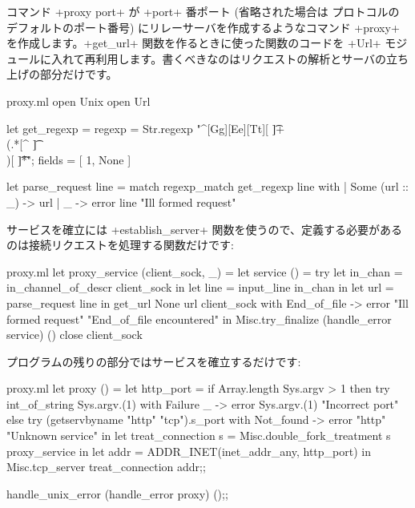 コマンド \ml+proxy port+ が \ml+port+ 番ポート (省略された場合は \http プロトコルのデフォルトのポート番号) にリレーサーバを作成するようなコマンド \ml+proxy+ を作成します。\ml+get_url+ 関数を作るときに使った関数のコードを \ml+Url+ モジュールに入れて再利用します。書くべきなのはリクエストの解析とサーバの立ち上げの部分だけです。
%
\begin{listingcodefile}{proxy.ml}
open Unix
open Url

let get_regexp =
  { regexp = Str.regexp "^[Gg][Ee][Tt][ \t]+\\(.*[^ \t]\\)[ \t]*\r";
    fields = [ 1, None ] }

let parse_request line = match regexp_match get_regexp line with
  | Some (url :: _) -> url
  | _ -> error line "Ill formed request"
\end{listingcodefile}
%
サービスを確立には \ml+establish_server+ 関数を使うので、定義する必要があるのは接続リクエストを処理する関数だけです:
%
\begin{listingcodefile}{proxy.ml}
let proxy_service (client_sock, _) =
  let service () =
    try
      let in_chan = in_channel_of_descr client_sock in
      let line = input_line in_chan in
      let url = parse_request line in
      get_url None url client_sock
    with End_of_file ->
      error "Ill formed request" "End_of_file encountered"
  in
  Misc.try_finalize
    (handle_error service) ()
    close client_sock
\end{listingcodefile}
\label{page/get_url}
%
プログラムの残りの部分ではサービスを確立するだけです:
%
\begin{listingcodefile}{proxy.ml}
let proxy () =
  let http_port =
    if Array.length Sys.argv > 1 then
      try int_of_string Sys.argv.(1)
      with Failure _ -> error Sys.argv.(1) "Incorrect port"
    else
      try (getservbyname "http" "tcp").s_port
      with Not_found -> error "http" "Unknown service"
  in
  let treat_connection s = Misc.double_fork_treatment s proxy_service in
  let addr = ADDR_INET(inet_addr_any, http_port) in
  Misc.tcp_server treat_connection addr;;

handle_unix_error (handle_error proxy) ();;
\end{listingcodefile}

